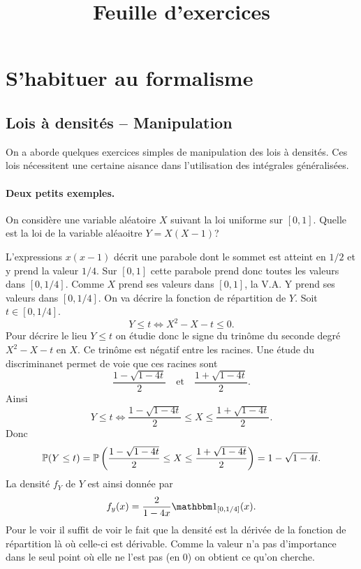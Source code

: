 \documentclass[11pt, a4paper]{article}
\title{%
  { \huge Feuille d'exercices}%
}
\author{}
\date{}
\begin{document}
\maketitle\thispagestyle{fancy}

\section{S'habituer au formalisme}
\label{sec:formalisme}


\subsection{Lois à densités -- Manipulation}

\noindent On a aborde quelques exercices simples de manipulation des lois à
densités. Ces lois nécessitent une certaine aisance dans l'utilisation
des intégrales généralisées.

\paragraph{Deux petits exemples.}

\begin{question}
  On considère une variable aléatoire $X$ suivant la loi uniforme sur
  $[0, 1]$. Quelle est la loi de la variable aléaoitre $Y = X(X-1)$?
\end{question}

\begin{solution}
  L'expressions $x(x-1)$ décrit une parabole dont le sommet est
  atteint en $1/2$ et y prend la valeur $1/4$. Sur $[0, 1]$ cette
  parabole prend donc toutes les valeurs dans $[0, 1/4]$. Comme $X$
  prend ses valeurs dans $[0, 1]$, la V.A. Y prend ses valeurs dans
  $[0, 1/4]$. On va décrire la fonction de répartition de $Y$. Soit
  $t \in [0, 1/4]$.
  \[
  Y \leq t \Longleftrightarrow X^2 - X - t \leq 0.
  \]
  Pour décrire le lieu $Y \leq t$ on étudie donc le signe du trinôme
  du seconde degré $X^2 - X - t$ en $X$. Ce trinôme est négatif entre
  les racines. Une étude du discriminanet permet de voie que ces
  racines sont
  \[
  \frac{1 - \sqrt{1-4t}}{2} \quad \textrm{et} \quad \frac{1 +
    \sqrt{1-4t}}{2}.
  \]
  Ainsi
  \[
  Y \leq t \Longleftrightarrow \frac{1 - \sqrt{1-4t}}{2} \leq X \leq
  \frac{1 + \sqrt{1-4t}}{2}.
  \]
  Donc
  \[
  \mathbb{P}(Y \leq t) = \mathbb{P}\left(\frac{1 - \sqrt{1-4t}}{2} \leq X \leq \frac{1 +
    \sqrt{1-4t}}{2}\right) = 1 - \sqrt{1-4t}.
  \]
  La densité $f_Y$ de $Y$ est ainsi donnée par
  \[
  f_y(x) = \frac{2}{1 - 4x}\bOne_{[0, 1/4]}(x).
  \]
  Pour le voir il suffit de voir le fait que la densité est la dérivée
  de la fonction de répartition là où celle-ci est dérivable. Comme la
  valeur n'a pas d'importance dans le seul point où elle ne l'est pas
  (en $0$) on obtient ce qu'on cherche.
\end{solution}
\end{document}
